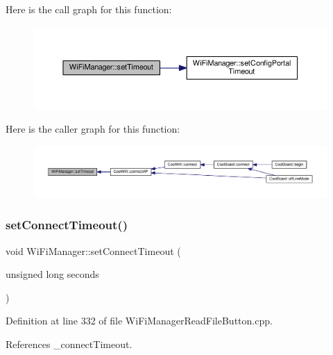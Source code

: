 Here is the call graph for this function\+:
\nopagebreak
\begin{figure}[H]
\begin{center}
\leavevmode
\includegraphics[width=350pt]{d4/dc8/class_wi_fi_manager_aa6493d59c284ff245edb767ff684756d_cgraph}
\end{center}
\end{figure}
Here is the caller graph for this function\+:
\nopagebreak
\begin{figure}[H]
\begin{center}
\leavevmode
\includegraphics[width=350pt]{d4/dc8/class_wi_fi_manager_aa6493d59c284ff245edb767ff684756d_icgraph}
\end{center}
\end{figure}
\mbox{\label{class_wi_fi_manager_a508fa98e77d165b29764f68d48b7a349}} 
\subsubsection{\texorpdfstring{set\+Connect\+Timeout()}{setConnectTimeout()}}
{\footnotesize\ttfamily void Wi\+Fi\+Manager\+::set\+Connect\+Timeout (\begin{DoxyParamCaption}\item[{unsigned long}]{seconds }\end{DoxyParamCaption})}



Definition at line 332 of file Wi\+Fi\+Manager\+Read\+File\+Button.\+cpp.



References \+\_\+connect\+Timeout.

\mbox{\label{class_wi_fi_manager_a70d7f17596b9f10c3e4770702ac991c5}} 
